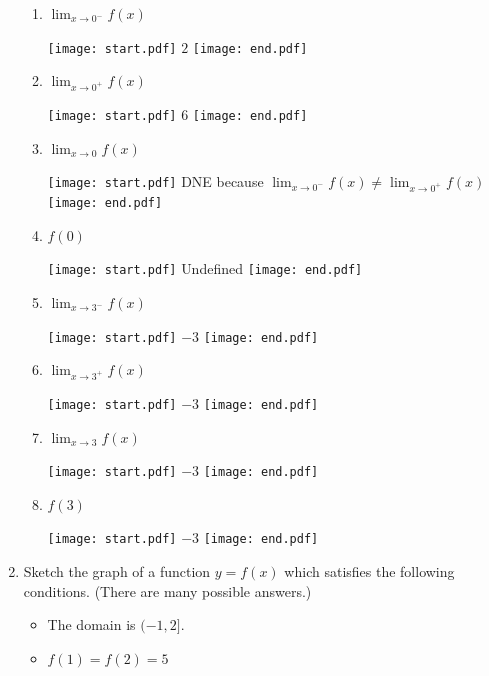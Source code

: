 \documentclass[12pt]{article}
\begin{document}
\begin{enumerate}
\begin{enumerate}

\item $\displaystyle \lim_{x \rightarrow 0^{-}}{f(x)}$

\texttt{[image: start.pdf]}
{{$2$}}
\texttt{[image: end.pdf]}


\item $\displaystyle \lim_{x \rightarrow 0^{+}}{f(x)}$

\texttt{[image: start.pdf]}
{{$6$}}
\texttt{[image: end.pdf]}


\item $\displaystyle \lim_{x \rightarrow 0}{f(x)}$

\texttt{[image: start.pdf]}
{{DNE because $\displaystyle \lim_{x \rightarrow 0^{-}}f(x) \neq \lim_{x \rightarrow 0^{+}}f(x)$}}
\texttt{[image: end.pdf]}


\item $f(0)$

\texttt{[image: start.pdf]}
{{Undefined}}
\texttt{[image: end.pdf]}


\item $\displaystyle \lim_{x \rightarrow 3^{-}}{f(x)}$

\texttt{[image: start.pdf]}
{{$-3$}}
\texttt{[image: end.pdf]}


\item $\displaystyle \lim_{x \rightarrow 3^{+}}{f(x)}$

\texttt{[image: start.pdf]}
{{$-3$}}
\texttt{[image: end.pdf]}


\item $\displaystyle \lim_{x \rightarrow 3}{f(x)}$

\texttt{[image: start.pdf]}
{{$-3$}}
\texttt{[image: end.pdf]}


\item $f(3)$

\texttt{[image: start.pdf]}
{{$-3$}}
\texttt{[image: end.pdf]}


\end{enumerate}

\item Sketch the graph of a function $y=f(x)$ which satisfies the following conditions. (There are many possible answers.)

\begin{itemize}

\item The domain is $(-1,2]$.

\item $f(1)=f(2)=5$


\end{itemize}
\end{enumerate}
\end{document}
